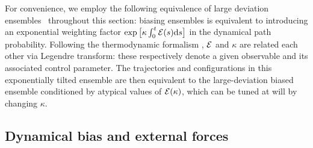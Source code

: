 \documentclass[superscriptaddress, twocolumn, prx, longbibliography, nofootinbib]{revtex4-1}
\newcommand{\tn}[1]{{\color{red}#1}}
\begin{document}
\tn{For convenience, we employ the following equivalence of large deviation ensembles~\cite{Chetrite2013} throughout this section: biasing ensembles is equivalent to } 
introducing an exponential weighting factor $\exp\big[\kappa\int_0^t{\cal E}(s){\rm d}s\big]$ in the dynamical path probability.
\tn{Following the thermodynamic formalism \cite{Touchette2009}, $\cal E$ and $\kappa$ are related each other via Legendre transform:} these respectively denote a given observable and its associated control parameter. The trajectories and configurations \tn{in this exponentially tilted ensemble} are then equivalent to the large-deviation biased ensemble conditioned by atypical values of $\cal E(\kappa)$, which can be tuned at will by changing $\kappa$.









\subsection{Dynamical bias and external forces}\label{sec:biasexternal}
\end{document}
